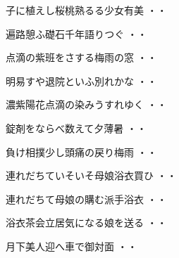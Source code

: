 \vspace{0.6cm}
\begin{shiika}子に植えし桜桃熟るる少女有美
\hfill{・・}\end{shiika}
\vspace{0.6cm}
\begin{shiika}遍路憩ふ礎石千年語りつぐ
\hfill{・・}\end{shiika}
\vspace{0.6cm}
\begin{shiika}点滴の紫班をさする梅雨の窓
\hfill{・・}\end{shiika}
\vspace{0.6cm}
\begin{shiika}明易すや退院といふ別れかな
\hfill{・・}\end{shiika}
\vspace{0.6cm}
\begin{shiika}濃紫陽花点滴の染みうすれゆく
\hfill{・・}\end{shiika}
\vspace{0.6cm}
\begin{shiika}錠剤をならべ数えて夕薄暑
\hfill{・・}\end{shiika}
\vspace{0.6cm}
\begin{shiika}負け相撲少し頭痛の戻り梅雨
\hfill{・・}\end{shiika}
\vspace{0.6cm}
\begin{shiika}連れだちていそいそ母娘浴衣買ひ
\hfill{・・}\end{shiika}
\vspace{0.6cm}
\begin{shiika}連れだちて母娘の購む派手浴衣
\hfill{・・}\end{shiika}
\vspace{0.6cm}
\begin{shiika}浴衣茶会立居気になる娘を送る
\hfill{・・}\end{shiika}
\vspace{0.6cm}
\begin{shiika}月下美人迎へ車で御対面
\hfill{・・}\end{shiika}
